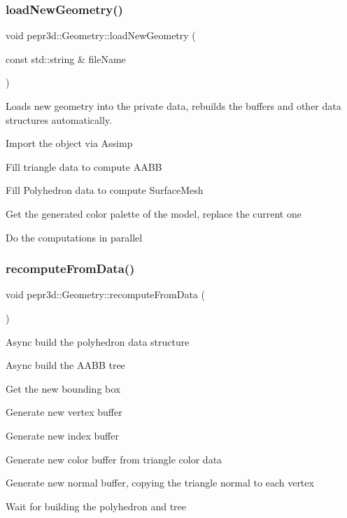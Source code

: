 \subsubsection{\texorpdfstring{loadNewGeometry()}{loadNewGeometry()}}
{\footnotesize\ttfamily void pepr3d\+::\+Geometry\+::load\+New\+Geometry (\begin{DoxyParamCaption}\item[{const std\+::string \&}]{file\+Name }\end{DoxyParamCaption})}



Loads new geometry into the private data, rebuilds the buffers and other data structures automatically. 

Import the object via Assimp

Fill triangle data to compute A\+A\+BB

Fill Polyhedron data to compute Surface\+Mesh

Get the generated color palette of the model, replace the current one

Do the computations in parallel \mbox{\label{classpepr3d_1_1_geometry_a7671cab77f226a80cbea5703aba2026c}} 
\subsubsection{\texorpdfstring{recomputeFromData()}{recomputeFromData()}}
{\footnotesize\ttfamily void pepr3d\+::\+Geometry\+::recompute\+From\+Data (\begin{DoxyParamCaption}{ }\end{DoxyParamCaption})}

Async build the polyhedron data structure

Async build the A\+A\+BB tree

Get the new bounding box

Generate new vertex buffer

Generate new index buffer

Generate new color buffer from triangle color data

Generate new normal buffer, copying the triangle normal to each vertex

Wait for building the polyhedron and tree \mbox{\label{classpepr3d_1_1_geometry_aa473f80280346656024fc494994c065e}} 
